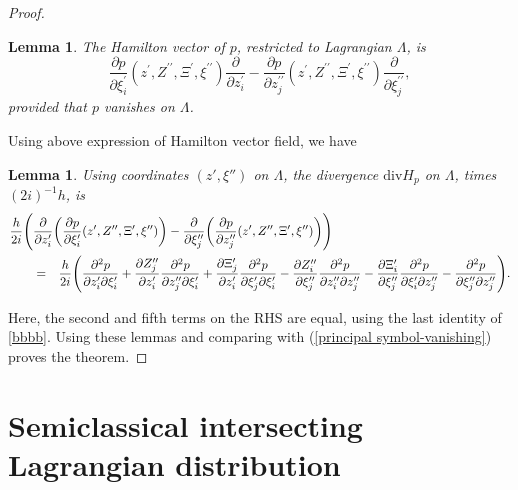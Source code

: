 \documentclass[10pt, a4paper, twoside]{amsart}
\numberwithin{equation}{section}
\newtheorem{lemma}[theorem]{Lemma}
\theoremstyle{remark}
\begin{document}
\begin{appendix}
\begin{proof}
	
	
	\begin{lemma}  The Hamilton vector of $p$, restricted to Lagrangian $\Lambda$, is $$\frac{\partial p}{\partial \xi^\prime_i}(z^\prime, Z^{\prime\prime}, \Xi^{\prime}, \xi^{\prime\prime}) \frac{\partial}{\partial z^\prime_i} -  \frac{\partial p}{\partial z_j^{\prime\prime}}(z^\prime, Z^{\prime\prime}, \Xi^{\prime}, \xi^{\prime\prime}) \frac{\partial}{\partial \xi^{\prime\prime}_j},$$ provided that $p$ vanishes on $\Lambda$.\end{lemma}
	
	Using above expression of Hamilton vector field, we have
	\begin{lemma} Using coordinates $(z', \xi'')$ on $\Lambda$, the divergence $\mathrm{div} H_p$ on $\Lambda$, times $(2i)^{-1} h$,  is \begin{eqnarray*}
	\frac{h}{2i} \Bigg( \lefteqn{\frac{\partial}{\partial z^\prime_i} \bigg( \frac{\partial p}{\partial \xi^\prime_i}(z^\prime, Z^{\prime\prime}, \Xi^{\prime}, \xi^{\prime\prime}) \bigg) -  \frac{\partial}{\partial \xi^{\prime\prime}_j} \bigg( \frac{\partial p}{\partial z_j^{\prime\prime}}(z^\prime, Z^{\prime\prime}, \Xi^{\prime}, \xi^{\prime\prime}) \bigg)\Bigg) } \\ 
	& = & \frac{h}{2i} \Bigg( \frac{\partial^2 p}{\partial z_i^\prime \partial \xi_i^\prime}  +  \frac{\partial Z^{\prime\prime}_j}{\partial z^\prime_i} \frac{\partial^2 p}{\partial z_j^{\prime\prime} \partial \xi_i^\prime} + \frac{\partial \Xi^\prime_j}{\partial z^\prime_i} \frac{\partial^2 p}{\partial \xi_j^\prime \partial \xi_i^\prime} -   \frac{\partial Z^{\prime\prime}_i}{\partial \xi^{\prime\prime}_j} \frac{\partial^2 p}{\partial z_i^{\prime\prime} \partial z_j^{\prime\prime}} - \frac{\partial \Xi^{\prime}_i}{\partial \xi^{\prime\prime}_j} \frac{\partial^2 p}{\partial \xi^\prime_i \partial z_j^{\prime\prime}} - \frac{\partial^2 p}{\partial \xi_j^{\prime\prime} \partial z_j^{\prime\prime}} \Bigg) .\end{eqnarray*}
	\end{lemma}
	Here, the second and fifth terms on the RHS are equal, using the last identity of \eqref{bbbb}. Using these lemmas and comparing with 
	(\ref{principal symbol-vanishing}) proves the theorem.
	\end{proof}
	
	
	\section{Semiclassical intersecting Lagrangian distribution}\label{sec:appB}
	

\end{appendix}
\end{document}

